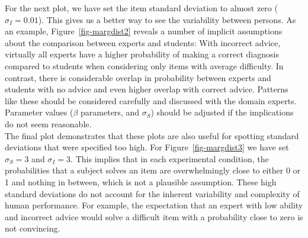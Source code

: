 \documentclass[
  man,
  floatsintext,
  longtable,
  a4paper,
  nolmodern,
  notxfonts,
  notimes,
  colorlinks=true,linkcolor=blue,citecolor=blue,urlcolor=blue]{apa7}
\begin{document}
For the next plot, we have set the item standard deviation to almost
zero (\(\sigma_I = 0.01\)). This gives us a better way to see the
variability between persons. As an example, Figure~\ref{fig-margdist2}
reveals a number of implicit assumptions about the comparison between
experts and students: With incorrect advice, virtually all experts have
a higher probability of making a correct diagnosis compared to students
when considering only items with average difficulty. In contrast, there
is considerable overlap in probability between experts and students with
no advice and even higher overlap with correct advice. Patterns like
these should be considered carefully and discussed with the domain
experts. Parameter values (\(\beta\) parameters, and \(\sigma_S\))
should be adjusted if the implications do not seem reasonable.\\
The final plot demonstrates that these plots are also useful for
spotting standard deviations that were specified too high. For
Figure~\ref{fig-margdist3} we have set \(\sigma_S = 3\) and
\(\sigma_I = 3\). This implies that in each experimental condition, the
probabilities that a subject solves an item are overwhelmingly close to
either 0 or 1 and nothing in between, which is not a plausible
assumption. These high standard deviations do not account for the
inherent variability and complexity of human performance. For example,
the expectation that an expert with low ability and incorrect advice
would solve a difficult item with a probability close to zero is not
convincing.
\end{document}
